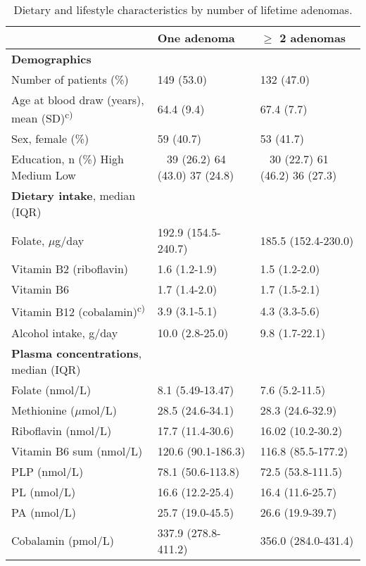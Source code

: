 \begin{table}
\small
\caption{Dietary and lifestyle characteristics by number of lifetime adenomas.}
\label{table5_1}
\begin{adjustbox}{width=\textwidth}
\begin{tabular}{C{5.5cm}C{3.5cm}C{3cm}}

\hline ~ & \bfseries\color{black} One adenoma & \bfseries\color{black} ${\geq}$ 2
adenomas\\
\hline
\bfseries Demographics & ~ & ~ \\
\hline
 Number of patients (\%) & 149 (53.0) & 132 (47.0)\\
\hline
 Age at blood draw (years), mean (SD)\textsuperscript{c)} & 64.4 (9.4) & 67.4 (7.7)\\
\hline
 Sex, female (\%) & 59 (40.7) & 53 (41.7)\\
\hline
{ Education, n (\%)}{ High}{ Medium} Low & ~ { 39 (26.2)}{ 64 (43.0)} 37 (24.8) & ~ { 30 (22.7)}{ 61 (46.2)} 36 (27.3)\\
\hline
 \textbf{Dietary intake}, median (IQR) & ~ & ~ \\
\hline
 Folate, \textrm{${\mu}$}g/day & 192.9 (154.5-240.7) & 185.5 (152.4-230.0)\\
\hline
 Vitamin B2 (riboflavin) & 1.6 (1.2-1.9) & 1.5 (1.2-2.0)\\
\hline
 Vitamin B6 & 1.7 (1.4-2.0) & 1.7 (1.5-2.1)\\
\hline
 Vitamin B12
(cobalamin)\textsuperscript{c)} & 3.9 (3.1-5.1) & 4.3 (3.3-5.6)\\
\hline
 Alcohol intake, g/day & 10.0 (2.8-25.0) & 9.8 (1.7-22.1)\\
\hline
 \textbf{Plasma concentrations}, median (IQR) & ~ & ~ \\
\hline
 Folate (nmol/L) & 8.1 (5.49-13.47) & 7.6 (5.2-11.5)\\
\hline
 Methionine (\textrm{${\mu}$}mol/L) & 28.5 (24.6-34.1) & 28.3 (24.6-32.9)\\
\hline
 Riboflavin (nmol/L) & 17.7 (11.4-30.6) & 16.02 (10.2-30.2)\\
\hline
 Vitamin B6 sum (nmol/L) & 120.6 (90.1-186.3) & 116.8 (85.5-177.2)\\
\hline
 PLP (nmol/L) & 78.1 (50.6-113.8) & 72.5 (53.8-111.5)\\
\hline
 PL (nmol/L) & 16.6 (12.2-25.4) & 16.4 (11.6-25.7)\\
\hline
 PA (nmol/L) & 25.7 (19.0-45.5) & 26.6 (19.9-39.7)\\
\hline
 Cobalamin (pmol/L) & 337.9 (278.8-411.2) & 356.0 (284.0-431.4)\\

\end{tabular}
\end{adjustbox}
\end{table}
